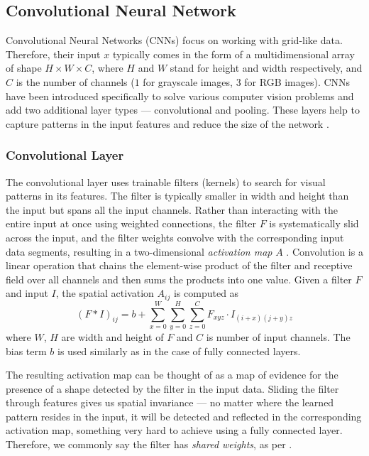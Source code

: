 \subsection*{Convolutional Neural Network}
Convolutional Neural Networks (CNNs) focus on working with grid-like data.
Therefore, their input $x$ typically comes in the form of a multidimensional array of shape $H \times W \times C$, where $H$ and $W$ stand for height and width respectively, and $C$ is the number of channels ($1$ for grayscale images, $3$ for RGB images).
CNNs have been introduced specifically to solve various computer vision problems and add two additional layer types --- convolutional and pooling.
These layers help to capture patterns in the input features and reduce the size of the network \cite{cnns}. 

\subsubsection{Convolutional Layer}

The convolutional layer uses trainable filters (kernels) to search for visual patterns in its features.
The filter is typically smaller in width and height than the input but spans all the input channels.
Rather than interacting with the entire input at once using weighted connections, the filter $F$ is systematically slid across the input, and the filter weights convolve with the corresponding input data segments, resulting in a two-dimensional \emph{activation map} $A$ \cite{goodfellow}.
Convolution is a linear operation that chains the element-wise product of the filter and receptive field over all channels and then sums the products into one value. Given a filter $F$ and input $I$, the spatial activation $A_{ij}$ is computed as 
\begin{equation}
    (F * I)_{ij} = b + \sum_{x=0}^{W} \sum_{y=0}^{H} \sum_{z=0}^{C} F_{xyz} \cdot I_{(i+x)(j+y)z}
\end{equation}
where $W$, $H$ are width and height of $F$ and $C$ is number of input channels. The bias term $b$ is used similarly as in the case of fully connected layers.

The resulting activation map can be thought of as a map of evidence for the presence of a shape detected by the filter in the input data.
Sliding the filter through features gives us spatial invariance --- no matter where the learned pattern resides in the input, it will be detected and reflected in the corresponding activation map, something very hard to achieve using a fully connected layer.
Therefore, we commonly say the filter has \emph{shared weights}, as per \cite{goodfellow}.

